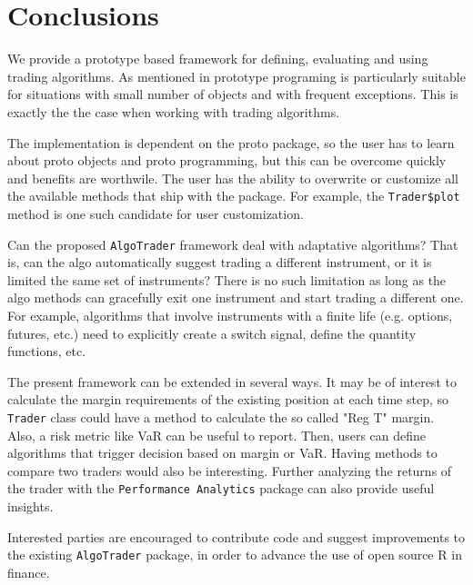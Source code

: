 \documentclass[nofootinbib]{revtex4}
\newcommand{\R}{{\normalfont\textsf{R }}{}}
\newcommand{\code}[1]{{\texttt{#1}}}
\begin{document}
\section{Conclusions}
\label{Conclusions}

We provide a prototype based framework for defining, evaluating and
using trading algorithms.  As mentioned in \cite{KatesPetzoldt}
prototype programing is particularly suitable for situations with
small number of objects and with frequent exceptions.  This is exactly
the the case when working with trading algorithms.

The implementation is dependent on the proto package, so the user has
to learn about proto objects and proto programming, but this can be
overcome quickly and benefits are worthwile.  The user has the ability
to overwrite or customize all the available methods that ship with the
package.   For example, the \code{Trader\$plot} method is one such
candidate for user customization.

Can the proposed \code{AlgoTrader} framework deal with adaptative
algorithms?  That is, can the algo automatically suggest trading a
different instrument, or it is limited the same set of instruments?
There is no such limitation as long as the algo methods can gracefully
exit one instrument and start trading a different one.  For example,
algorithms that involve instruments with a finite life (e.g. options,
futures, etc.) need to explicitly create a switch signal, define the
quantity functions, etc.  

The present framework can be extended in several ways.  It may be of
interest to calculate the margin requirements of the existing position
at each time step, so \code{Trader} class could have a method to
calculate the so called "Reg T" margin.  Also, a risk metric like VaR
can be useful to report.  Then, users can define algorithms that
trigger decision based on margin or VaR.  Having methods to compare
two traders would also be interesting.  Further analyzing the returns
of the trader with the \code{Performance Analytics}\cite{PA} package
can also provide useful insights.

Interested parties are encouraged to contribute code and suggest
improvements to the existing \code{AlgoTrader} package, in order to
advance the use of open source \R in finance.
\end{document}
